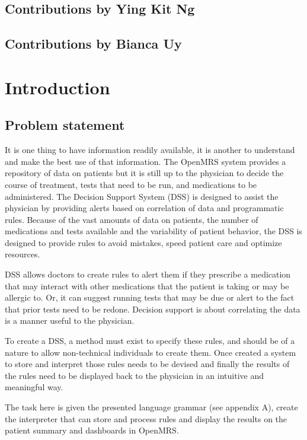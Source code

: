 \documentclass[12pt,letterpaper]{article}
\begin{document}
\subsection{Contributions by Ying Kit Ng}

\subsection{Contributions by Bianca Uy}


\newpage 
\section{Introduction}

\subsection{Problem statement}

It is one thing to have information readily available, it is another to understand and make the best use of that information.  The OpenMRS system provides a repository of data on patients but it is still up to the physician to decide the course of treatment, tests that need to be run, and medications to be administered.  The Decision Support System (DSS) is designed to assist the physician by providing alerts based on correlation of data and programmatic rules.  Because of the vast amounts of data on patients, the number of medications and tests available and the variability of patient behavior, the DSS is designed to provide rules to avoid mistakes, speed patient care and optimize resources.

DSS allows doctors to create rules to alert them if they prescribe a medication that may interact with other medications that the patient is taking or may be allergic to.   Or, it can suggest running tests that may be due or alert to the fact that prior tests need to be redone.  Decision support is about correlating the data is a manner useful to the physician.

To create a DSS, a method must exist to specify these rules, and should be of a nature to allow non-technical individuals to create them.  Once created a system to store and interpret those rules needs to be devised and finally the results of the rules need to be displayed back to the physician in an intuitive and meaningful way.

The task here is given the presented language grammar (see appendix A), create the interpreter that can store and process rules and display the results on the patient summary and dashboards in OpenMRS.
\end{document}
